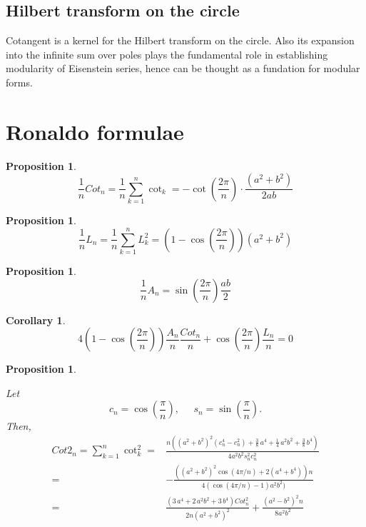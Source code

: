 \documentclass[12pt]{article}
\numberwithin{equation}{section}
\newtheorem{corollary}[dummy]{Corollary}     %
\newtheorem{proposition}[dummy]{Proposition} %
\begin{document}
\subsection{Hilbert transform on the circle}
Cotangent is a kernel for the Hilbert transform on the circle.
Also its expansion into the infinite sum over poles
plays the fundamental role in establishing modularity
of Eisenstein series, hence can be thought as a fundation for modular forms.

\section{Ronaldo formulae}

\begin{proposition}\label{prop:somacotan}
\[ \frac{1}{n} Cot_n =
\frac{1}{n} \sum_{k=1}^n \cot_k =  - \cot \left({\frac{2π}{n}}\right) \cdot \frac {\left( {a}^{2}+{b}^{2} \right) }{2ab}
\] 
\end{proposition}


\begin{proposition}\label{prop:somaL2}
\[ \frac{1}{n} L_n = \frac{1}{n} \sum_{k=1}^n L_k^2 = \left( 1-\cos \left(  {\frac {2π}{n}} \right)  \right)  \left( 
{a}^{2}+{b}^{2} \right) 
\]
\end{proposition}

\begin{proposition}\label{prop:areaN}
\[\frac{1}{n} A_n= \sin \left( {\frac{2π}{n}} \right) \frac{ab}{2}\]
\end{proposition}

\begin{corollary}
\[ 4\left(1-\cos\left(\frac{2π}{n}\right) \right) \frac{A_n}{n} \frac{Cot_n}{n}  +  \cos\left(\frac{2π}{n}\right) \frac{L_n}{n} = 0\]
\end{corollary}
\begin{proposition}\label{prop:somacotan2}

Let \[ c_n=\cos\left(\frac{\pi}{n}\right), \;\;\;\;\;  s_n=\sin\left(\frac{\pi}{n}\right). \]
Then,
\begin{align*}
Cot2_n=\sum_{k=1}^n \cot_k^2 = &\frac {n \left(  \left( {a}^{2}+{b}^{2} \right) ^{2} (c_n^{
4}-  c_n^{2}) +\frac{3}{8}\,{a}^{4}+\frac{1}{4}
\,{a}^{2}{b}^{2}+\frac{3}{8}\,{b}^{4} \right) }{4{a}^{2}{b}^{2} s_n^{2}
 c_n^{2}}\\
 =& -\frac{((a^2+b^2)^2\cos(4\pi/n)+2 (a^4+ b^4)) n}{    4 (\cos(4\pi/n)-1)  a^2 b^2)}\\
 =&  \frac{\left( 3\,a^{4}+2\,a^{2}b^{2}+3\,b^{4}\right) Cot_n^2}{2n\left( a^{2}+b^{2} \right)^{2}}+ \frac{
 \left(a^2-b^2 \right)^{2}   n}{8a^{2}b^{2}}
\end{align*} 
\end{proposition}
\end{document}
